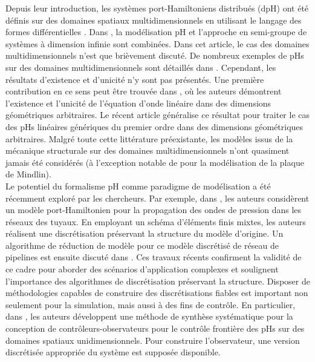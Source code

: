 Depuis leur introduction, les systèmes port-Hamiltoniens distribués (dpH) ont été définis sur des domaines spatiaux multidimensionnels en utilisant le langage des formes différentielles \cite{vanderschaft2002}. Dans \cite{villegas2007}, la modélisation pH et l'approche en semi-groupe de systèmes à dimension infinie sont combinées. Dans cet article, le cas des domaines multidimensionnels n'est que brièvement discuté. De nombreux exemples de pHs sur des domaines multidimensionnels sont détaillés dans \cite[Chapitre 4]{duindam2009}. Cependant, les résultats d'existence et d'unicité n'y sont pas présentés. Une première contribution en ce sens peut être trouvée dans \cite{zwart2015wave}, où les auteurs démontrent l'existence et l'unicité de l'équation d'onde linéaire dans des dimensions géométriques arbitraires. Le récent article \cite{skrepek2019wellposedness} généralise ce résultat pour traiter le cas des pHs linéaires génériques du premier ordre dans des dimensions géométriques arbitraires. Malgré toute cette littérature préexistante, les modèles issus de la mécanique structurale sur des domaines multidimensionnels n'ont quasiment jamais été considérés (à l'exception notable de \cite{macchelli2005mindlin} pour la modélisation de la plaque de Mindlin). \\

Le potentiel du formalisme pH comme paradigme de modélisation a été récemment exploré par les chercheurs. Par exemple, dans \cite{egger2018damped}, les auteurs considèrent un modèle port-Hamiltonien pour la propagation des ondes de pression dans les réseaux des tuyaux. En employant un schéma d'éléments finis mixtes, les auteurs réalisent une discrétisation préservant la structure du modèle d'origine. Un algorithme de réduction de modèle pour ce modèle discrétisé de réseau de pipelines est ensuite discuté dans \cite{egger2018}. Ces travaux récents confirment la validité de ce cadre pour aborder des scénarios d'application complexes et soulignent l'importance des algorithmes de discrétisation préservant la structure. Disposer de méthodologies capables de construire des discrétisations fiables est important non seulement pour la simulation, mais aussi à des fins de contrôle. En particulier, dans \cite{toledo2020}, les auteurs développent une méthode de synthèse systématique pour la conception de contrôleurs-observateurs pour le contrôle frontière des pHs sur des domaines spatiaux unidimensionnels. Pour construire l'observateur, une version discrétisée appropriée du système est supposée disponible. \\

